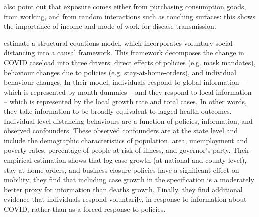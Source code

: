 \documentclass{article}
\begin{document}
\textcite{eichenbaumMacroeconomicsEpidemics2020} also point out that exposure comes either from purchasing consumption goods, from working, and from random interactions such as touching surfaces: this shows the importance of income and mode of work for disease transmission. 

\textcite{chernozhukovCausalImpactMasks2021} estimate a structural equations model, which incorporates voluntary social distancing into a causal framework. This framework decomposes the change in COVID caseload into three drivers: direct effects of policies (e.g. mask mandates), behaviour changes due to policies (e.g. stay-at-home-orders), and individual behaviour changes. In their model, individuals respond to global information -- which is represented by month dummies -- and they respond to local information -- which is represented by the local growth rate and total cases. In other words, they take information to be broadly equivalent to lagged health outcomes. Individual-level distancing behaviours are a function of policies, information, and observed confounders. These observed confounders are at the state level and include the demographic characteristics of population, area, unemployment and poverty rates, percentage of people at risk of illness, and governor's party. Their empirical estimation shows that log case growth (at national and county level), stay-at-home orders, and business closure policies have a significant effect on mobility; they find that including case growth in the specification is a moderately better proxy for information than deaths growth. Finally, they find additional evidence that individuals respond voluntarily, in response to information about COVID, rather than as a forced response to policies.
\end{document}
